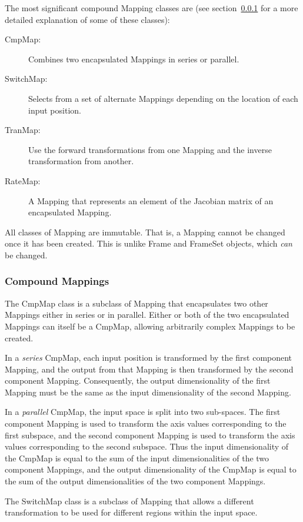 \documentclass[final,authoryear,5p,times,twocolumn]{elsarticle}
\begin{document}
The most significant compound Mapping classes are (see
section~\ref{sec:cmpmap} for a more detailed explanation of some of these
classes):

\begin{description}
\item[CmpMap:] Combines two encapsulated Mappings in series or parallel.
\item[SwitchMap:] Selects from a set of alternate Mappings depending on
the location of each input position.
\item[TranMap:] Use the forward transformations from one Mapping and the
inverse transformation from another.
\item[RateMap:] A Mapping that represents an element of the Jacobian
matrix of an encapsulated Mapping.
\end{description}

All classes of Mapping are immutable. That is, a Mapping cannot be changed
once it has been created. This is unlike Frame and FrameSet objects, which
\emph{can} be changed.

\subsubsection{Compound Mappings}
\label{sec:cmpmap}

The CmpMap class is a subclass of Mapping that encapsulates two other
Mappings either in series or in parallel. Either or both of the two
encapsulated Mappings can itself be a CmpMap, allowing arbitrarily complex
Mappings to be created.

In a \emph{series} CmpMap, each input position is transformed by the
first component Mapping, and the output from that Mapping is then
transformed by the second component Mapping. Consequently, the output
dimensionality of the first Mapping must be the same as the input
dimensionality of the second Mapping.

In a \emph{parallel} CmpMap, the input space is split into two sub-spaces.
The first component Mapping is used to transform the axis values
corresponding to the first subspace, and the second component Mapping is
used to transform the axis values corresponding to the second subspace.
Thus the input dimensionality of the CmpMap is equal to the sum of the
input dimensionalities of the two component Mappings, and the output
dimensionality of the CmpMap is equal to the sum of the output
dimensionalities of the two component Mappings.

The SwitchMap class is a subclass of Mapping that allows a different
transformation to be used for different regions within the input space.
\end{document}
